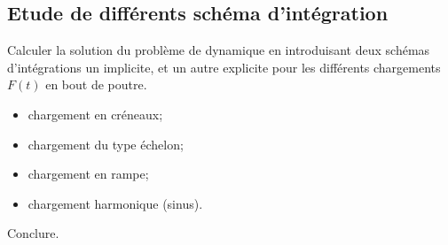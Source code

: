 \documentclass[fleqn]{article}
\begin{document}
\subsection{Etude de différents schéma d'intégration}

Calculer la solution du problème de dynamique en introduisant deux schémas d'intégrations un implicite, et un autre explicite pour les différents chargements $F(t)$ en bout de poutre.

\begin{itemize}
	\item chargement en créneaux;
	\item chargement du type échelon;
	\item chargement en rampe;
	\item chargement harmonique (sinus).
\end{itemize}

Conclure.
\end{document}
